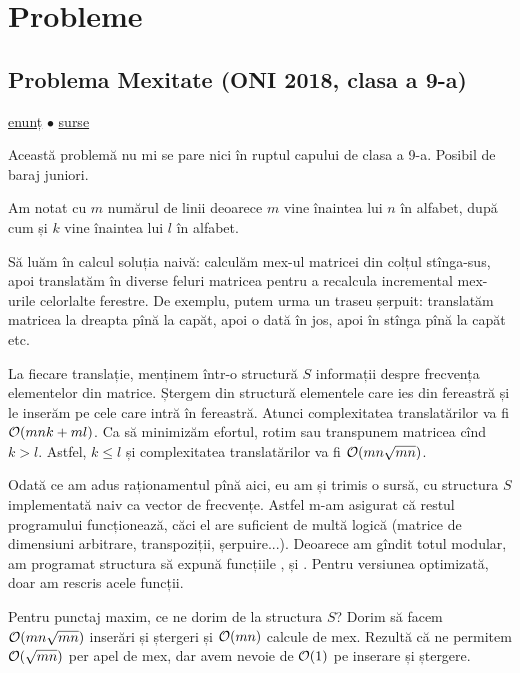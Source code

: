 \documentclass[../main.tex]{subfiles}
\begin{document}
\section{Probleme}

\subsection{Problema Mexitate (ONI 2018, clasa a 9-a)}
\label{problem:mexitate}

\href{https://kilonova.ro/problems/1521}{enunț}
$\bullet$
\hyperref[code:mexitate]{surse}

Această problemă nu mi se pare nici în ruptul capului de clasa a 9-a. Posibil de baraj juniori.

Am notat cu $m$ numărul de linii deoarece $m$ vine înaintea lui $n$ în alfabet, după cum și $k$ vine înaintea lui $l$ în alfabet.

Să luăm în calcul soluția naivă: calculăm mex-ul matricei din colțul stînga-sus, apoi translatăm în diverse feluri matricea pentru a recalcula incremental mex-urile celorlalte ferestre. De exemplu, putem urma un traseu șerpuit: translatăm matricea la dreapta pînă la capăt, apoi o dată în jos, apoi în stînga pînă la capăt etc.

La fiecare translație, menținem într-o structură $S$ informații despre frecvența elementelor din matrice. Ștergem din structură elementele care ies din fereastră și le inserăm pe cele care intră în fereastră. Atunci complexitatea translatărilor va fi $\mathcal{O}(mnk + ml)$. Ca să minimizăm efortul, rotim sau transpunem matricea cînd $k > l$. Astfel, $k \leq l$ și complexitatea translatărilor va fi $\mathcal{O}(mn \sqrt{mn})$.

Odată ce am adus raționamentul pînă aici, eu am și trimis o sursă, cu structura $S$ implementată naiv ca vector de frecvențe. Astfel m-am asigurat că restul programului funcționează, căci el are suficient de multă logică (matrice de dimensiuni arbitrare, transpoziții, șerpuire...). Deoarece am gîndit totul modular, am programat structura  să expună funcțiile ,  și . Pentru versiunea optimizată, doar am rescris acele funcții.

Pentru punctaj maxim, ce ne dorim de la structura $S$? Dorim să facem $\mathcal{O}(mn \sqrt{mn})$ inserări și ștergeri și $\mathcal{O}(mn)$ calcule de mex. Rezultă că ne permitem $\mathcal{O}(\sqrt{mn})$ per apel de mex, dar avem nevoie de $\mathcal{O}(1)$ pe inserare și ștergere.
\end{document}
